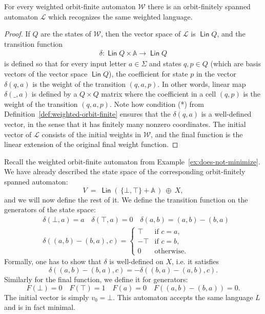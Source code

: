 \documentclass{theoretics}
\newcommand{\set}[1]{\{#1\}}
\newcommand{\Ll}{{\mathcal L}}
\newcommand{\Ww}{{\mathcal W}}
\newcommand{\atoms}{\mathbb A}
\DeclareMathOperator{\lin}{\mathsf{Lin}}
\newcommand{\red}[1]{#1}
\newcommand{\blue}[1]{#1}
\begin{document}
\begin{lemma}\label{lem:weighted-to-linear}
    For every weighted orbit-finite automaton $\Ww$ there is an orbit-finitely spanned automaton $\Ll$ which recognizes the same weighted language.
\end{lemma}
\begin{proof}
 If $Q$ are the states of $\Ww$, then the vector space of $\Ll$  is $\lin Q$, and the transition function
    \begin{align*}
    \delta : \lin Q \times \atoms \to \lin Q
    \end{align*}
    is defined so that for every input letter $a \in \Sigma$ and states $q,p \in Q$ (which are basis vectors of the vector space $\lin Q$), the coefficient for state $p$ in the vector $\delta(q,a)$ is the weight of the transition $(q,a,p)$.
    In other words, linear map $\delta(\_,a)$ is defined by a $Q \times Q$ matrix where the coefficient in a cell $(q,p)$ is the weight of the transition $(q,a,p)$.
    Note how condition (*) from Definition~\ref{def:weighted-orbit-finite} ensures that the $\delta(q,a)$ is a well-defined vector, in the sense that it has finitely many nonzero coordinates. The initial vector of $\Ll$ consists of the initial weights in $\Ww$, and the final function is the linear extension of the original final weight function.
\end{proof}

\begin{example}
    Recall the weighted orbit-finite automaton from Example~\ref{ex:does-not-minimize}.
    We have already described the state space of the corresponding orbit-finitely spanned automaton:
    \[ V \ = \ \blue{\lin(\,\set{\bot, \top} + \atoms\,)} \ \oplus\  \red{X} , \]
    and we will now define the rest of it.
    We define the transition function on the generators of the state space:
    \begin{align*}
    &\delta(\blue{\bot}, a) = \blue{a} \quad \delta(\blue{\top}, a) = 0 \quad \delta(\blue{a},b) = \red{(a,b) - (b,a)}
    \\ &\delta(\red{(a,b) - (b,a)}, c) = \begin{cases}
        \blue{\top} & \text{if $c=a$,} \\
        \blue{-\top} & \text{if $c=b$,} \\
        0 & \text{otherwise.}
    \end{cases}
    \end{align*}
    Formally, one has to show that $\delta$ is well-defined on $\red{X}$, i.e. it satisfies 
    \[\delta(\red{(a,b) - (b,a)}, c) = -\delta(\red{(b,a) - (a,b)}, c).\]
    Similarly for the final function, we define it for generators:
    \[ F(\blue{\bot}) = 0 \quad F(\blue{\top}) = 1 \quad F(\blue{a}) = 0 \quad F(\red{(a,b) - (b,a)}) = 0 . \]
    The initial vector is simply $v_0 = \blue{\bot}$.
    This automaton accepts the same language $L$ and is in fact minimal.
\end{example}
\end{document}
